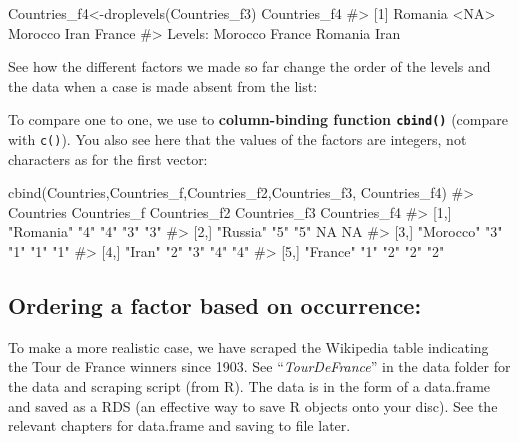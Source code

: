 \documentclass[
  letterpaper,
  DIV=11,
  numbers=noendperiod]{scrreprt}
\newenvironment{Shaded}{\begin{snugshade}}{\end{snugshade}}
\newcommand{\CommentTok}[1]{\textcolor[rgb]{0.37,0.37,0.37}{#1}}
\newcommand{\FunctionTok}[1]{\textcolor[rgb]{0.28,0.35,0.67}{#1}}
\newcommand{\NormalTok}[1]{\textcolor[rgb]{0.00,0.23,0.31}{#1}}
\newcommand{\OtherTok}[1]{\textcolor[rgb]{0.00,0.23,0.31}{#1}}
\begin{document}
\begin{Shaded}
\begin{Highlighting}[]
\NormalTok{Countries\_f4}\OtherTok{\textless{}{-}}\FunctionTok{droplevels}\NormalTok{(Countries\_f3)}
\NormalTok{Countries\_f4}
\CommentTok{\#\textgreater{} [1] Romania \textless{}NA\textgreater{}    Morocco Iran    France }
\CommentTok{\#\textgreater{} Levels: Morocco France Romania Iran}
\end{Highlighting}
\end{Shaded}

See how the different factors we made so far change the order of the
levels and the data when a case is made absent from the list:

To compare one to one, we use to \textbf{column-binding function
\texttt{cbind()}} (compare with \texttt{c()}). You also see here that
the values of the factors are integers, not characters as for the first
vector:

\begin{Shaded}
\begin{Highlighting}[]
\FunctionTok{cbind}\NormalTok{(Countries,Countries\_f,Countries\_f2,Countries\_f3, Countries\_f4)}
\CommentTok{\#\textgreater{}      Countries Countries\_f Countries\_f2 Countries\_f3 Countries\_f4}
\CommentTok{\#\textgreater{} [1,] "Romania" "4"         "4"          "3"          "3"         }
\CommentTok{\#\textgreater{} [2,] "Russia"  "5"         "5"          NA           NA          }
\CommentTok{\#\textgreater{} [3,] "Morocco" "3"         "1"          "1"          "1"         }
\CommentTok{\#\textgreater{} [4,] "Iran"    "2"         "3"          "4"          "4"         }
\CommentTok{\#\textgreater{} [5,] "France"  "1"         "2"          "2"          "2"}
\end{Highlighting}
\end{Shaded}

\subsection{Ordering a factor based on
occurrence:}\label{ordering-a-factor-based-on-occurrence}

To make a more realistic case, we have scraped the Wikipedia table
indicating the Tour de France winners since 1903. See
``\emph{TourDeFrance}'' in the data folder for the data and scraping
script (from R). The data is in the form of a data.frame and saved as a
RDS (an effective way to save R objects onto your disc). See the
relevant chapters for data.frame and saving to file later.
\end{document}

